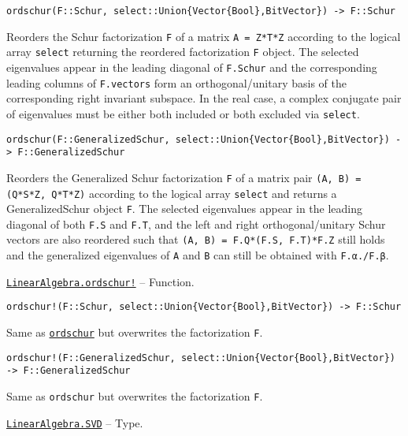 \begin{adjustwidth}{2em}{0pt}


\begin{verbatim}
ordschur(F::Schur, select::Union{Vector{Bool},BitVector}) -> F::Schur
\end{verbatim}

Reorders the Schur factorization \texttt{F} of a matrix \texttt{A = Z*T*Z{\textquotesingle}} according to the logical array \texttt{select} returning the reordered factorization \texttt{F} object. The selected eigenvalues appear in the leading diagonal of \texttt{F.Schur} and the corresponding leading columns of \texttt{F.vectors} form an orthogonal/unitary basis of the corresponding right invariant subspace. In the real case, a complex conjugate pair of eigenvalues must be either both included or both excluded via \texttt{select}.




\begin{lstlisting}
ordschur(F::GeneralizedSchur, select::Union{Vector{Bool},BitVector}) -> F::GeneralizedSchur
\end{lstlisting}

Reorders the Generalized Schur factorization \texttt{F} of a matrix pair \texttt{(A, B) = (Q*S*Z{\textquotesingle}, Q*T*Z{\textquotesingle})} according to the logical array \texttt{select} and returns a GeneralizedSchur object \texttt{F}. The selected eigenvalues appear in the leading diagonal of both \texttt{F.S} and \texttt{F.T}, and the left and right orthogonal/unitary Schur vectors are also reordered such that \texttt{(A, B) = F.Q*(F.S, F.T)*F.Z{\textquotesingle}} still holds and the generalized eigenvalues of \texttt{A} and \texttt{B} can still be obtained with \texttt{F.α./F.β}.



\end{adjustwidth}
\hypertarget{871218922691469554}{}
\hyperlink{871218922691469554}{\texttt{LinearAlgebra.ordschur!}}  -- {Function.}

\begin{adjustwidth}{2em}{0pt}


\begin{verbatim}
ordschur!(F::Schur, select::Union{Vector{Bool},BitVector}) -> F::Schur
\end{verbatim}

Same as \hyperlink{4329711108255537481}{\texttt{ordschur}} but overwrites the factorization \texttt{F}.




\begin{lstlisting}
ordschur!(F::GeneralizedSchur, select::Union{Vector{Bool},BitVector}) -> F::GeneralizedSchur
\end{lstlisting}

Same as \texttt{ordschur} but overwrites the factorization \texttt{F}.



\end{adjustwidth}
\hypertarget{10448068302163375703}{}
\hyperlink{10448068302163375703}{\texttt{LinearAlgebra.SVD}}  -- {Type.}

